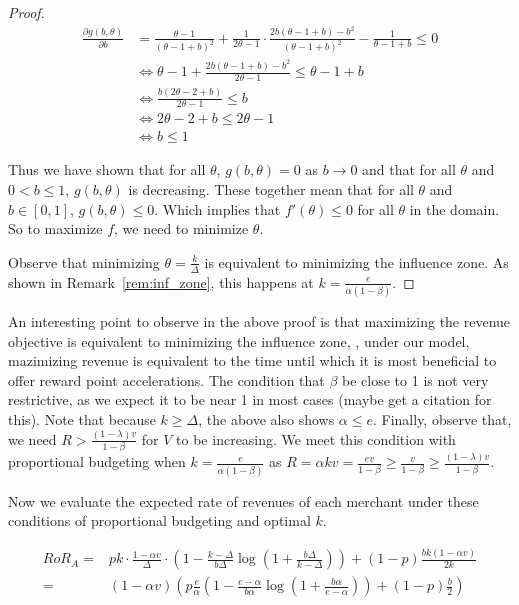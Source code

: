 \begin{proof}
\begin{align*}
\frac{\partial g(b,\theta)}{\partial b} &= \frac{\theta-1}{(\theta-1+b)^2}+\frac{1}{2\theta-1}\cdot \frac{2b(\theta-1+b)-b^2}{(\theta-1+b)^2} -\frac{1}{\theta-1+b} \leq 0 \\
&\iff \theta-1 + \frac{2b(\theta-1+b)-b^2}{2\theta-1} \leq \theta-1+b \\
&\iff \frac{b(2\theta-2+b)}{2\theta-1} \leq b \\
&\iff 2\theta-2+b \leq 2\theta-1 \\
&\iff b \leq 1
\end{align*}

Thus we have shown that for all $\theta$, $g(b,\theta) = 0$ as $b \to 0$ and that for all $\theta$ and $0 < b \leq 1$, $g(b,\theta)$ is decreasing. 
These together mean that for all $\theta$ and $b \in [0,1]$, $g(b,\theta) \leq 0$. 
Which implies that $f'(\theta) \le 0$ for all $\theta$ in the domain.
So to maximize $f$, we need to minimize $\theta$.

Observe that minimizing $\theta = \frac{k}{\Delta}$ is equivalent to minimizing the influence zone.
As shown in Remark~\ref{rem:inf_zone}, this happens at $k = \frac{e}{\alpha(1-\beta)}$. 
\end{proof}

An interesting point to observe in the above proof is that maximizing the revenue objective is equivalent to minimizing the influence zone, \ie, under our model, mazimizing revenue is equivalent to the time until which it is most beneficial to offer reward point accelerations. 
The condition that $\beta$ be close to 1 is not very restrictive, as we expect it to be near 1 in most cases {\nolan (maybe get a citation for this)}. Note that because $k \geq \Delta$, the above also shows $\alpha \leq e$. 
Finally, observe that, we need $R > \frac{(1-\lambda)v}{1-\beta}$ for $V$ to be increasing. 
We meet this condition with proportional budgeting when $k = \frac{e}{\alpha(1-\beta)}$ as $R = \alpha k v = \frac{e v}{1-\beta} \geq \frac{v}{1-\beta} \geq \frac{(1-\lambda)v}{1-\beta}$. 

Now we evaluate the expected rate of revenues of each merchant under these conditions of proportional budgeting and optimal $k$.

\begin{align*}
RoR_A =& pk\cdot\frac{1-\alpha v}{\Delta}\cdot\left(1 - \frac{k-\Delta}{b\Delta}\log\left(1+\frac{b\Delta}{k-\Delta}\right)\right) + (1-p)\frac{bk(1-\alpha v)}{2k}\\
      =& (1-\alpha v) \left(p\frac{e}{\alpha}\left(1-\frac{e-\alpha}{b\alpha}\log\left(1+\frac{b\alpha}{e-\alpha}\right)\right) + (1-p)\frac{b}{2}\right)
\end{align*}

